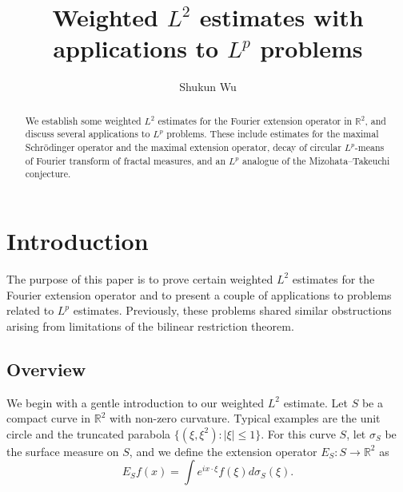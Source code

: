 \documentclass{amsart}
\numberwithin{equation}{section}
\newcommand{\si}{\sigma}
\newcommand{\ZR}{\mathbb{R}}
\begin{document}
\title{Weighted $L^2$ estimates with applications to $L^p$ problems}


\author{Shukun Wu} \address{ Shukun Wu\\  Department of Mathematics\\ Indiana University Bloomington, USA} 


\begin{abstract}
We establish some weighted $L^2$ estimates for the Fourier extension operator in $\ZR^2$, and discuss several applications to $L^p$ problems.
These include estimates for the maximal Schr\"odinger operator and the maximal extension operator, decay of circular $L^p$-means of Fourier transform of fractal measures, and an $L^p$ analogue of the Mizohata–Takeuchi conjecture. 
\end{abstract}

\maketitle


\section{Introduction}

The purpose of this paper is to prove certain weighted $L^2$ estimates for the Fourier extension operator and to present a couple of applications to problems related to $L^p$ estimates.
Previously, these problems shared similar obstructions arising from limitations of the bilinear restriction theorem. 


\medskip

\subsection{Overview}
We begin with a gentle introduction to our weighted $L^2$ estimate.
Let $S$ be a compact curve in $\ZR^2$ with non-zero curvature. 
Typical examples are the unit circle and the truncated parabola $\{(\xi,\xi^2):|\xi|\leq 1\}$.
For this curve $S$, let $\si_S$ be the surface measure on $S$, and we define the extension operator $E_S:S\to\ZR^2$ as
\begin{equation}
\label{extension}
    E_Sf(x)=\int e^{ix\cdot\xi}f(\xi)d\si_S(\xi).
\end{equation}
\end{document}
